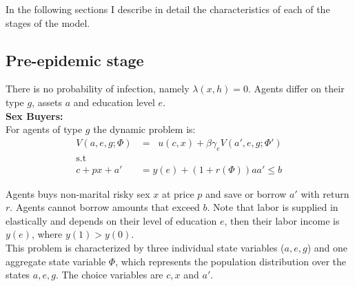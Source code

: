 In the following sections I describe in detail the characteristics of each of the stages of the model.  

\subsection{Pre-epidemic stage}\label{pre}
There is no probability of infection, namely $\lambda(x,h)=0$. Agents differ on their type $g$, assets $a$ and education level $e$.\\

\noindent\textbf{Sex Buyers:}\\
For agents of type $g$ the dynamic problem is:
\begin{align}
V(a,e,g;\Phi) &= \mathop{\max_{c\geq 0,x \geq 0,a' \geq 0}}  u(c,x) + \beta \gamma_{e} V(a',e,g;\Phi') \label{eq1}\\
\mbox{s.t}\nonumber\\
c+ px +a'&= y(e) + (1+r(\Phi))a \label{eq2}
a' \leq b
\end{align}

 Agents buys non-marital risky sex $x$ at price $p$ and save or borrow $a'$ with return $r$. Agents cannot borrow amounts that exceed $b$. Note that labor is supplied in elastically and depends on their level of education $e$, then their labor income is $y(e)$, where $y(1)>y(0)$.\\
 This problem is characterized by three individual state variables ($a,e,g$) and one aggregate state variable $\Phi$, which represents the population distribution over the states $a,e,g$. The choice variables are $c,x$ and $a'$.\\
\begin{comment}
 The above problem can be written in sequential form: 
\begin{align*}
\mathop{\max_{c_{t},x_{t},a_{t+1}}}&E_{0}\sum^{\infty}_{t=0}\beta^{t}u(c_{t},x_{t})  \\
\mbox{s.t}\\ 
c_{t}+p_{t}x_{t}+a_{t+1}&=y(e)+(1+r_{t})a_{t}
\end{align*}
 \textbf{FOC's:}\\
 \begin{align*}
 \frac{\partial u(c_{t},x_{t})}{\partial x_{t}}&=-u'_{c}(c_{t},x_{t})p_{t}+u'_{x}(c_{t},x_{t})=0\\
 \frac{\partial u(c_{t},x_{t})}{\partial a_{t+1}}&=-u'_{c}(c_{t},x_{t})+u'_{c}(c_{t+1},x_{t+1})(1+r_{t})\beta=0
 \end{align*}
 Given the price system $\{p_{t}\}_{t=0}^{\infty},\{r_{t}\}_{t=0}^{\infty}$ the solution is characterized by the sequence of allocations $\{c_{t}\}_{t=0}^{\infty}, \{x_{t}\}_{t=0}^{\infty}, \{a_{t}\}_{t=0}^{\infty}$ such that they solve the above maximization problem.\\
\end{comment}

